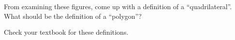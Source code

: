 \documentclass[nooutcomes,noauthor]{ximera}
\begin{document}
\begin{problem}
From examining these figures, come up with a definition of a ``quadrilateral''.  What should be the definition of a ``polygon''?

\end{problem}

\begin{solution}
Check your textbook for these definitions.
\end{solution}

    




\end{document}
